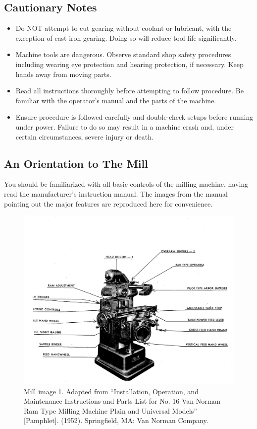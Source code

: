 \documentclass[12pt,twoside,letterpaper]{article}
\begin{document}
\subsection{Cautionary Notes}

\begin{itemize}
\item Do NOT attempt to cut gearing without coolant or lubricant, with the exception of cast iron gearing. Doing so will reduce tool life significantly. 
\item Machine tools are dangerous. Observe standard shop safety procedures including wearing eye protection and hearing protection, if necessary. Keep hands away from moving parts. 
\item Read all instructions thoroughly before attempting to follow procedure. Be familiar with the operator's manual and the parts of the machine. 
\item Ensure procedure is followed carefully and double-check setups before running under power. Failure to do so may result in a machine crash and, under certain circumstances, severe injury or death.
\end{itemize}




\subsection{An Orientation to The Mill}


You should be familiarized with all basic controls of the milling machine, having read the manufacturer's instruction manual. The images from the manual pointing out the major features are reproduced here for convenience.


\begin{figure}[H]
	\centering
		\includegraphics[width=5in]{diagram1}
\caption{Mill image 1. Adapted from ``Installation, Operation, and Maintenance Instructions and Parts List for No. 16 Van Norman Ram Type Milling Machine Plain and Universal Models'' [Pamphlet]. (1952). Springfield, MA: Van Norman Company. }
\end{figure}
\end{document}
